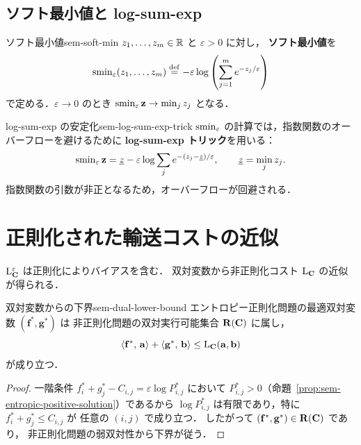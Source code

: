 \subsection{ソフト最小値と log-sum-exp}

\begin{definition}{ソフト最小値}{sem-soft-min}
  $z_1,\ldots,z_m \in \mathbb{R}$ と $\varepsilon>0$ に対し，
  \textbf{ソフト最小値}を
  \[
    \operatorname{smin}_\varepsilon(z_1,\ldots,z_m)
    \overset{\mathrm{def}}{=}
    -\varepsilon\log\left(\sum_{j=1}^{m} e^{-z_j/\varepsilon}\right)
  \]
  で定める．$\varepsilon \to 0$ のとき
  $\operatorname{smin}_\varepsilon \mathbf{z} \to \min_j z_j$ となる．
\end{definition}

\begin{remark}{log-sum-exp の安定化}{sem-log-sum-exp-trick}
  $\operatorname{smin}_\varepsilon$ の計算では，指数関数のオーバーフローを避けるために
  \textbf{log-sum-exp トリック}を用いる：
  \[
    \operatorname{smin}_\varepsilon \mathbf{z}
    = \underline{z} - \varepsilon \log \sum_j e^{-(z_j - \underline{z})/\varepsilon},
    \qquad \underline{z} = \min_j z_j.
  \]
  指数関数の引数が非正となるため，オーバーフローが回避される．
\end{remark}

\section{正則化された輸送コストの近似}
\label{sec:sem-sinkhorn-divergence}

$\mathrm{L}_{\mathbf{C}}^\varepsilon$ は正則化によりバイアスを含む．
双対変数から非正則化コスト $\mathrm{L}_{\mathbf{C}}$ の近似が得られる．

\begin{proposition}{双対変数からの下界}{sem-dual-lower-bound}
  エントロピー正則化問題の最適双対変数 $(\mathbf{f}^*, \mathbf{g}^*)$ は
  非正則化問題の双対実行可能集合 $\mathbf{R}(\mathbf{C})$ に属し，
  \[
    \langle \mathbf{f}^*,\, \mathbf{a} \rangle + \langle \mathbf{g}^*,\, \mathbf{b} \rangle
    \leq \mathrm{L}_{\mathbf{C}}(\mathbf{a}, \mathbf{b})
  \]
  が成り立つ．
\end{proposition}

\begin{proof}
  一階条件 $f_i^* + g_j^* - C_{i,j} = \varepsilon \log P_{i,j}^*$ において
  $P_{i,j}^* > 0$（命題~\ref{prop:sem-entropic-positive-solution}）であるから
  $\log P_{i,j}^*$ は有限であり，特に $f_i^* + g_j^* \leq C_{i,j}$ が
  任意の $(i,j)$ で成り立つ．
  したがって $(\mathbf{f}^*, \mathbf{g}^*) \in \mathbf{R}(\mathbf{C})$ であり，
  非正則化問題の弱双対性から下界が従う．
\end{proof}

